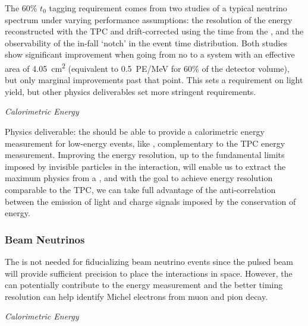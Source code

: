 The 60\% $t_0$ tagging requirement comes from two studies of a typical  neutrino spectrum under varying  performance assumptions: the resolution of the energy reconstructed with the TPC and drift-corrected using the time from the , and the observability of the in-fall `notch' in the  event time distribution. Both studies show significant improvement when going from no  to a system with an effective area of \SI{4.05}{cm^2} (equivalent to \SI{0.5}{PE/MeV} for 60\% of the detector volume), but only marginal improvements past that point. This sets a requirement on light yield, but other physics deliverables set more stringent requirements.


\textit{Calorimetric Energy}

Physics deliverable: the  should be able to provide a calorimetric energy measurement for low-energy events, like , complementary to the TPC energy measurement. 
Improving the energy resolution, up to the fundamental limits imposed by invisible particles in the interaction, will enable us to extract the maximum physics from a , and with the goal to achieve energy resolution comparable to the TPC, we can take full advantage of the anti-correlation between the emission of light and charge signals imposed by the conservation of energy.



\subsubsection{Beam Neutrinos}

The  is not needed for fiducializing beam neutrino events since the pulsed beam will provide sufficient precision to place the interactions in space. However, the  can potentially contribute to the energy measurement and the better timing resolution can help identify Michel electrons from muon and pion decay.


\textit{\it Calorimetric Energy}

